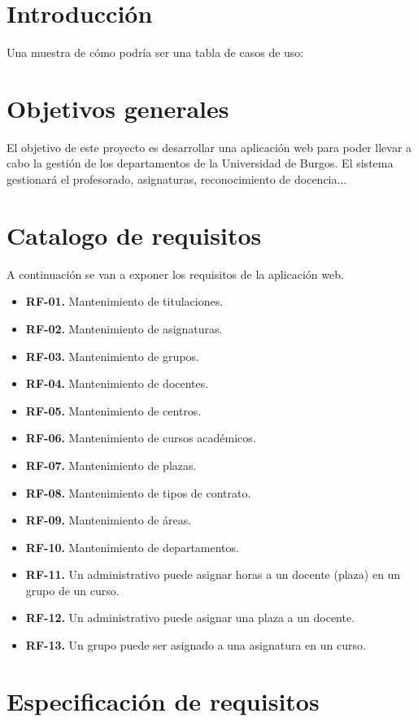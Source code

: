 
\section{Introducción}
Una muestra de cómo podría ser una tabla de casos de uso:


\section{Objetivos generales}
El objetivo de este proyecto es desarrollar una aplicación web para poder llevar a cabo la gestión de los departamentos de la Universidad de Burgos. El sistema gestionará el profesorado, asignaturas, reconocimiento de docencia...

\section{Catalogo de requisitos}
A continuación se van a exponer los requisitos de la aplicación web.

\begin{itemize}
	\item \textbf{RF-01.} Mantenimiento de titulaciones.
	\item \textbf{RF-02.} Mantenimiento de asignaturas.
	\item \textbf{RF-03.} Mantenimiento de grupos.
	\item \textbf{RF-04.} Mantenimiento de docentes.
	\item \textbf{RF-05.} Mantenimiento de centros.
	\item \textbf{RF-06.} Mantenimiento de cursos académicos.
	\item \textbf{RF-07.} Mantenimiento de plazas.
	\item \textbf{RF-08.} Mantenimiento de tipos de contrato.
	\item \textbf{RF-09.} Mantenimiento de áreas.
	\item \textbf{RF-10.} Mantenimiento de departamentos.
	\item \textbf{RF-11.} Un administrativo puede asignar horas a un docente (plaza) en un grupo de un curso.
	\item \textbf{RF-12.} Un administrativo puede asignar una plaza a un docente.
	\item \textbf{RF-13.} Un grupo puede ser asignado a una asignatura en un curso.
\end{itemize}

\clearpage
\section{Especificación de requisitos}
